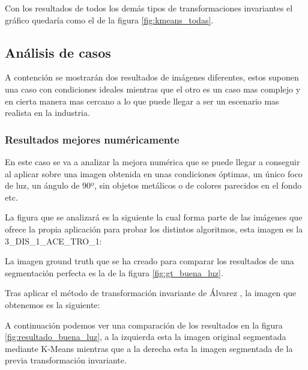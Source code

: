 
Con los resultados de todos los demás tipos de transformaciones invariantes el gráfico quedaría como el de la figura \ref{fig:kmeans_todas}.

\subsection{Análisis de casos}\label{análisis-de-casos}

A contención se mostrarán dos resultados de imágenes diferentes, estos suponen una caso con condiciones ideales mientras que el otro es un caso mas complejo y en cierta manera mas cercano a lo que puede llegar a ser un escenario mas realista en la industria.

\subsubsection{Resultados mejores numéricamente}\label{resultados-mejores-numéricamente}

En este caso se va a analizar la mejora numérica que se puede llegar a conseguir al aplicar sobre una imagen obtenida en unas condiciones óptimas, un único foco de luz, un ángulo de 90º, sin objetos metálicos o de colores parecidos en el fondo etc.

La figura que se analizará es la siguiente la cual forma parte de las imágenes que ofrece la propia aplicación para probar los distintos algoritmos, esta imagen es la 3\_DIS\_1\_ACE\_TRO\_1:


La imagen ground truth que se ha creado para comparar los resultados de una segmentación perfecta es la de la figura \ref{fig:gt_buena_luz}.


Tras aplicar el método de transformación invariante de Álvarez \cite{alvarez2011}, la imagen que obtenemos es la siguiente:


A continuación podemos ver una comparación de los resultados en la figura \ref{fig:resultado_buena_luz}, a la izquierda esta la imagen original segmentada mediante K-Means mientras que a la derecha esta la imagen segmentada de la previa transformación invariante.

